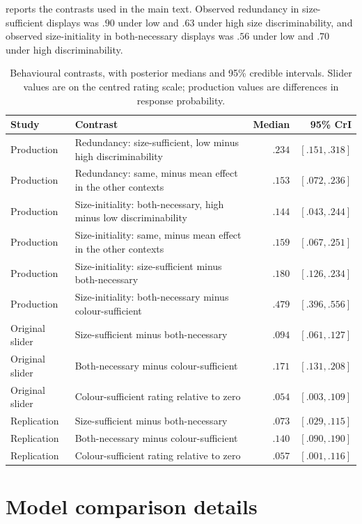 \documentclass[10pt,a4paper,fleqn]{article}
\begin{document}
 reports the contrasts used in the main text.
Observed redundancy in size-sufficient displays was $.90$ under low and $.63$ under high size discriminability, and observed size-initiality in both-necessary displays was $.56$ under low and $.70$ under high discriminability.

\begin{table}[H]
\centering
\small
\caption{Behavioural contrasts, with posterior medians and 95\% credible intervals.
Slider values are on the centred rating scale; production values are differences in response probability.}
\label{tab:behavioural-contrasts}
\begin{tabularx}{\textwidth}{l X r r}
\toprule
Study & Contrast & Median & 95\% CrI \\
\midrule
Production & Redundancy: size-sufficient, low minus high discriminability & $.234$ & $[.151,.318]$ \\
Production & Redundancy: same, minus mean effect in the other contexts & $.153$ & $[.072,.236]$ \\
Production & Size-initiality: both-necessary, high minus low discriminability & $.144$ & $[.043,.244]$ \\
Production & Size-initiality: same, minus mean effect in the other contexts & $.159$ & $[.067,.251]$ \\
Production & Size-initiality: size-sufficient minus both-necessary & $.180$ & $[.126,.234]$ \\
Production & Size-initiality: both-necessary minus colour-sufficient & $.479$ & $[.396,.556]$ \\
\midrule
Original slider & Size-sufficient minus both-necessary & $.094$ & $[.061,.127]$ \\
Original slider & Both-necessary minus colour-sufficient & $.171$ & $[.131,.208]$ \\
Original slider & Colour-sufficient rating relative to zero & $.054$ & $[.003,.109]$ \\
\midrule
Replication & Size-sufficient minus both-necessary & $.073$ & $[.029,.115]$ \\
Replication & Both-necessary minus colour-sufficient & $.140$ & $[.090,.190]$ \\
Replication & Colour-sufficient rating relative to zero & $.057$ & $[.001,.116]$ \\
\bottomrule
\end{tabularx}
\end{table}

\section{Model comparison details}
\label{app:comparison}
\end{document}
